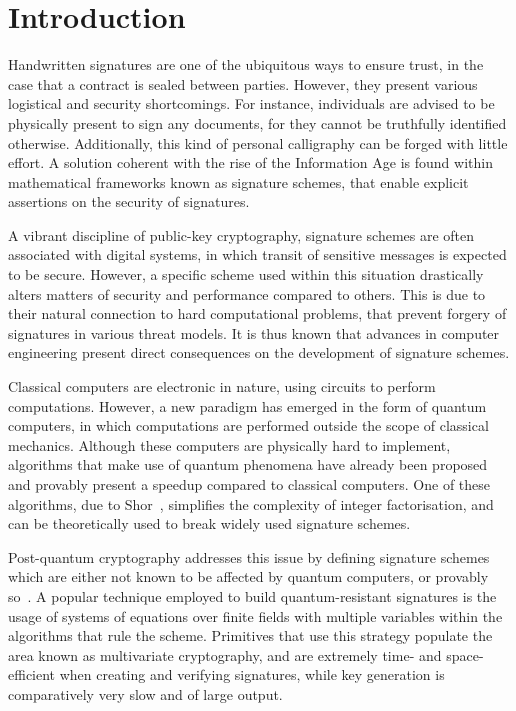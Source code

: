 \documentclass[openright, draft, 10pt]{report}
\begin{document}
\chapter{Introduction}

Handwritten signatures are one of the ubiquitous ways to ensure trust, in the case that a contract is sealed between parties. However, they present various logistical and security shortcomings. For instance, individuals are advised to be physically present to sign any documents, for they cannot be truthfully identified otherwise. Additionally, this kind of personal calligraphy can be forged with little effort. A solution coherent with the rise of the Information Age is found within mathematical frameworks known as signature schemes, that enable explicit assertions on the security of signatures.

A vibrant discipline of public-key cryptography, signature schemes are often associated with digital systems, in which transit of sensitive messages is expected to be secure. However, a specific scheme used within this situation drastically alters matters of security and performance compared to others. This is due to their natural connection to hard computational problems, that prevent forgery of signatures in various threat models. It is thus known that advances in computer engineering present direct consequences on the development of signature schemes.

Classical computers are electronic in nature, using circuits to perform computations. However, a new paradigm has emerged in the form of quantum computers, in which computations are performed outside the scope of classical mechanics. Although these computers are physically hard to implement, algorithms that make use of quantum phenomena have already been proposed and provably present a speedup compared to classical computers. One of these algorithms, due to Shor~\cite{Shor:199710:article}, simplifies the complexity of integer factorisation, and can be theoretically used to break widely used signature schemes.

Post-quantum cryptography addresses this issue by defining signature schemes which are either not known to be affected by quantum computers, or provably so~\cite{Bernstein:2008:book}. A popular technique employed to build quantum-resistant signatures is the usage of systems of equations over finite fields with multiple variables within the algorithms that rule the scheme. Primitives that use this strategy populate the area known as multivariate cryptography, and are extremely time- and space-efficient when creating and verifying signatures, while key generation is comparatively very slow and of large output.
\end{document}
